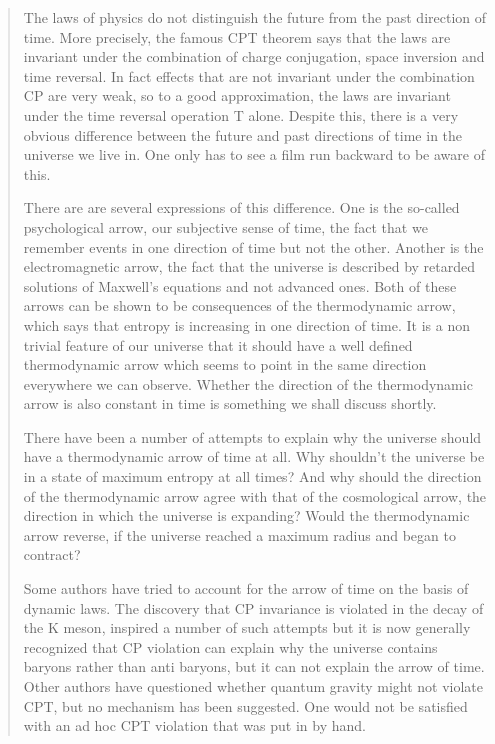 \documentclass{article}
\begin{document}
\begin{quote}
The laws of physics do not distinguish the future from the past
direction of time. More precisely, the famous CPT theorem says that the
laws are invariant under the combination of charge conjugation, space
inversion and time reversal. In fact effects that are not invariant
under the combination CP are very weak, so to a good approximation, the
laws are invariant under the time reversal operation T alone. Despite
this, there is a very obvious difference between the future and past
directions of time in the universe we live in. One only has to see a
film run backward to be aware of this.

There are are several expressions of this difference. One is the
so-called psychological arrow, our subjective sense of time, the fact
that we remember events in one direction of time but not the other.
Another is the electromagnetic arrow, the fact that the universe is
described by retarded solutions of Maxwell's equations and not advanced
ones. Both of these arrows can be shown to be consequences of the
thermodynamic arrow, which says that entropy is increasing in one
direction of time. It is a non trivial feature of our universe that it
should have a well defined thermodynamic arrow which seems to point in
the same direction everywhere we can observe. Whether the direction of
the thermodynamic arrow is also constant in time is something we shall
discuss shortly.

There have been a number of attempts to explain why the universe should
have a thermodynamic arrow of time at all. Why shouldn't the universe be
in a state of maximum entropy at all times? And why should the direction
of the thermodynamic arrow agree with that of the cosmological arrow,
the direction in which the universe is expanding? Would the
thermodynamic arrow reverse, if the universe reached a maximum radius
and began to contract?

Some authors have tried to account for the arrow of time on the basis of
dynamic laws. The discovery that CP invariance is violated in the decay
of the K meson, inspired a number of such attempts but it is now
generally recognized that CP violation can explain why the universe
contains baryons rather than anti baryons, but it can not explain the
arrow of time. Other authors have questioned whether quantum gravity
might not violate CPT, but no mechanism has been suggested. One would
not be satisfied with an ad hoc CPT violation that was put in by hand.


\end{quote}
\end{document}

